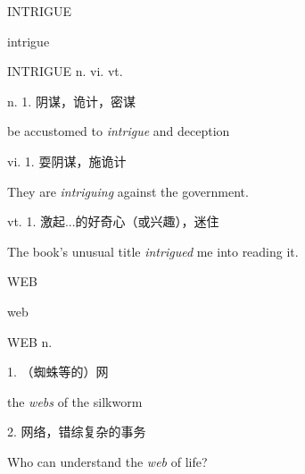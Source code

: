 \begin{flashcard}{
INTRIGUE

intrigue
}
\begin{center}
INTRIGUE n. vi. vt. 
\end{center}
n. 1. 阴谋，诡计，密谋

be accustomed to \textit{intrigue} and deception

vi. 1. 耍阴谋，施诡计

They are \textit{intriguing} against the government.

vt. 1. 激起...的好奇心（或兴趣），迷住

The book's unusual title \textit{intrigued} me into reading it.

\end{flashcard}
\begin{flashcard}{
WEB

web
}
\begin{center}
WEB n. \textipa{[web]}
\end{center}
1. （蜘蛛等的）网

the \textit{webs} of the silkworm

2. 网络，错综复杂的事务

Who can understand the \textit{web} of life?

\end{flashcard}
